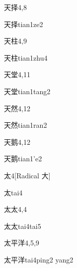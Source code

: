 \begin{entry}{天择}{4,8}
  \begin{phonetics}{天择}{tian1ze2}
  \end{phonetics}
\end{entry}

\begin{entry}{天柱}{4,9}
  \begin{phonetics}{天柱}{tian1zhu4}
  \end{phonetics}
\end{entry}

\begin{entry}{天堂}{4,11}
  \begin{phonetics}{天堂}{tian1tang2}
  \end{phonetics}
\end{entry}

\begin{entry}{天然}{4,12}
  \begin{phonetics}{天然}{tian1ran2}
  \end{phonetics}
\end{entry}

\begin{entry}{天鹅}{4,12}
  \begin{phonetics}{天鹅}{tian1'e2}
  \end{phonetics}
\end{entry}

\begin{entry}{太}{4}[Radical 大]
  \begin{phonetics}{太}{tai4}
  \end{phonetics}
\end{entry}

\begin{entry}{太太}{4,4}
  \begin{phonetics}{太太}{tai4tai5}
  \end{phonetics}
\end{entry}

\begin{entry}{太平洋}{4,5,9}
  \begin{phonetics}{太平洋}{tai4ping2 yang2}
  \end{phonetics}
\end{entry}

